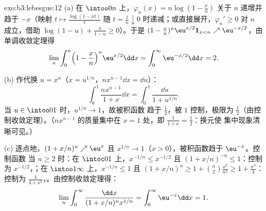 \begin{solution}{exo:b3:lebesgue:12}
(a) 在 $\intoo0n$ 上，$\varphi_n(x) = n\log(1 - \frac xn)$
关于 $n$ 递增并趋于 $-x$（映射 $t \mapsto
\frac{\log(1 - xt)}{t}$ 随 $t = \frac1n
\downarrow 0$ 时递减；或直接展开，$\varphi_{n}' \geq 0$ 对 $n$ 成立，借助
$\log(1-u) + \frac{u}{1-u} \geq 0$）。于是 $(1 -
\frac xn)^n\eu^{x/2}\mathbf 1_{x<n} \nearrow
\eu^{-x/2}$，由单调收敛定理得
\[
\lim_n\int_0^n\Bigl(1 - \frac xn\Bigr)^n\eu^{x/2}\dd x =
\int_0^\infty\eu^{-x/2}\dd x = 2 .
\]

(b) 作代换 $u = x^n$（$x = u^{1/n}$，$n x^{n-1}\dd x =
\dd u$）：
\[
\int_0^1\frac{nx^{n-1}}{1 + x}\dd x =
\int_0^1\frac{\dd u}{1 + u^{1/n}} .
\]
当 $u \in \intoo01$ 时，$u^{1/n} \to 1$，故被积函数
趋于 $\frac12$，被 $1$ 控制，极限为
$\frac12$（由控制收敛定理）。（$nx^{n-1}$ 的质量集中在 $x
= 1$ 处，即 $\frac1{1+x} = \frac12$：换元使
集中现象清晰可见。）

(c) 逐点地，$(1 + x/n)^n \nearrow \eu^x$ 且 $x^{1/n} \to
1$（$x > 0$），被积函数趋于 $\eu^{-x}$。控制函数
当 $n \geq 2$ 时：在 $\intoc01$ 上，$x^{-1/n} \leq x^{-1/2}$ 且
$(1 + x/n)^{-n} \leq 1$：控制为 $x^{-1/2}$，；在
$\intoo1\infty$ 上，$x^{-1/n} \leq 1$ 且 $(1 + x/n)^n \geq 1 +
\binom n2\frac{x^2}{n^2} \geq 1 + \frac{x^2}4$：控制为
$\frac{4}{4 + x^2}$，。由控制收敛定理得：
\[
\lim_n\int_0^\infty\frac{\dd x}{(1 + x/n)^nx^{1/n}} =
\int_0^\infty\eu^{-x}\dd x = 1 .
\]
\end{solution}

